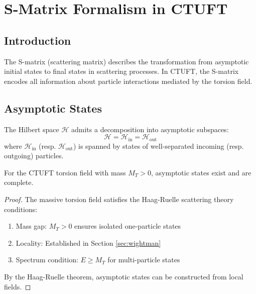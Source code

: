 \section{S-Matrix Formalism in CTUFT}
\label{sec:s_matrix}

\subsection{Introduction}

The S-matrix (scattering matrix) describes the transformation from asymptotic initial states to final states in scattering processes. In CTUFT, the S-matrix encodes all information about particle interactions mediated by the torsion field.

\subsection{Asymptotic States}

\begin{definition}
The Hilbert space $\mathcal{H}$ admits a decomposition into asymptotic subspaces:
\begin{equation}
    \mathcal{H} = \mathcal{H}_{\text{in}} = \mathcal{H}_{\text{out}}
\end{equation}
where $\mathcal{H}_{\text{in}}$ (resp. $\mathcal{H}_{\text{out}}$) is spanned by states of well-separated incoming (resp. outgoing) particles.
\end{definition}

\begin{theorem}
For the CTUFT torsion field with mass $M_T > 0$, asymptotic states exist and are complete.
\end{theorem}

\begin{proof}
The massive torsion field satisfies the Haag-Ruelle scattering theory conditions:
\begin{enumerate}
    \item Mass gap: $M_T > 0$ ensures isolated one-particle states
    \item Locality: Established in Section \ref{sec:wightman}
    \item Spectrum condition: $E \geq M_T$ for multi-particle states
\end{enumerate}
By the Haag-Ruelle theorem, asymptotic states can be constructed from local fields.
\end{proof}

